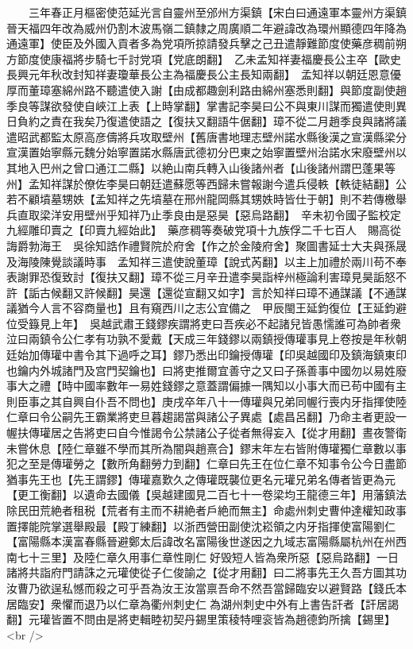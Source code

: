 　　三年春正月樞密使范延光言自靈州至邠州方渠鎮【宋白曰通遠軍本靈州方渠鎮晉天福四年改為威州仍割木波馬嶺二鎮隸之周廣順二年避諱改為環州顯德四年降為通遠軍】使臣及外國入貢者多為党項所掠請發兵擊之己丑遣靜難節度使藥彦稠前朔方節度使康福將步騎七千討党項【党底朗翻】　乙未孟知祥妻福慶長公主卒【歐史長興元年秋改封知祥妻瓊華長公主為福慶長公主長知兩翻】　孟知祥以朝廷恩意優厚而董璋塞綿州路不聽遣使入謝【由成都趣劍利路由綿州塞悉則翻】與節度副使趙季良等謀欲發使自峽江上表【上時掌翻】掌書記李昊曰公不與東川謀而獨遣使則異日負約之責在我矣乃復遣使語之【復扶又翻語牛倨翻】璋不從二月趙季良與諸將議遣昭武都監太原高彦儔將兵攻取壁州【舊唐書地理志壁州諾水縣後漢之宣漢縣梁分宣漢置始寧縣元魏分始寧置諾水縣唐武德初分巴東之始寧置壁州治諾水宋廢壁州以其地入巴州之曾口通江二縣】以絶山南兵轉入山後諸州者【山後諸州謂巴蓬果等州】孟知祥謀於僚佐李昊曰朝廷遣蘇愿等西歸未嘗報謝今遣兵侵軼【軼徒結翻】公若不顧墳墓甥妷【孟知祥之先墳墓在邢州龍岡縣其甥妷時皆仕于朝】則不若傳檄舉兵直取梁洋安用壁州乎知祥乃止季良由是惡昊【惡烏路翻】　辛未初令國子監校定九經雕印賣之【印賣九經始此】　藥彦稠等奏破党項十九族俘二千七百人　賜高從誨爵勃海王　吳徐知誥作禮賢院於府舍【作之於金陵府舍】聚圖書延士大夫與孫晟及海陵陳覺談議時事　孟知祥三遣使說董璋【說式芮翻】以主上加禮於兩川苟不奉表謝罪恐復致討【復扶又翻】璋不從三月辛丑遣李昊詣梓州極論利害璋見昊詬怒不許【詬古候翻又許候翻】昊還【還從宣翻又如字】言於知祥曰璋不通謀議【不通謀議猶今人言不容商量也】且有窺西川之志公宜備之　甲辰閩王延鈞復位【王延鈞避位受籙見上年】　吳越武肅王錢鏐疾謂將吏曰吾疾必不起諸兒皆愚懦誰可為帥者衆泣曰兩鎮令公仁孝有功孰不愛戴【天成三年錢鏐以兩鎮授傳瓘事見上卷按是年秋朝廷始加傳瓘中書令其下過呼之耳】鏐乃悉出印鑰授傳瓘【印吳越國印及鎮海鎮東印也鑰内外城諸門及宫門契鑰也】曰將吏推爾宜善守之又曰子孫善事中國勿以易姓廢事大之禮【時中國率數年一易姓錢鏐之意蓋謂偏據一隅知以小事大而已苟中國有主則臣事之其自興自仆吾不問也】庚戌卒年八十一傳瓘與兄弟同幄行喪内牙指揮使陸仁章曰令公嗣先王霸業將吏旦暮趨謁當與諸公子異處【處昌呂翻】乃命主者更設一幄扶傳瓘居之告將吏曰自今惟謁令公禁諸公子從者無得妄入【從才用翻】晝夜警衛未嘗休息【陸仁章雖不學而其所為闇與趙熹合】鏐末年左右皆附傳瓘獨仁章數以事犯之至是傳瓘勞之【數所角翻勞力到翻】仁章曰先王在位仁章不知事令公今日盡節猶事先王也【先王謂鏐】傳瓘嘉歎久之傳瓘既襲位更名元瓘兄弟名傳者皆更為元【更工衡翻】以遺命去國儀【吳越建國見二百七十一卷梁均王龍德三年】用藩鎮法除民田荒絶者租税【荒者有主而不耕絶者戶絶而無主】命處州刺史曹仲達權知政事置擇能院掌選舉殿最【殿丁練翻】以浙西營田副使沈崧領之内牙指揮使富陽劉仁【富陽縣本漢富春縣晉避鄭太后諱改名富陽後世遂因之九域志富陽縣屬杭州在州西南七十三里】及陸仁章久用事仁章性剛仁好毁短人皆為衆所惡【惡烏路翻】一日諸將共詣府門請誅之元瓘使從子仁俊諭之【從才用翻】曰二將事先王久吾方圖其功汝曹乃欲逞私憾而殺之可乎吾為汝王汝當禀吾命不然吾當歸臨安以避賢路【錢氏本居臨安】衆懼而退乃以仁章為衢州刺史仁為湖州刺史中外有上書告訐者【訐居謁翻】元瓘皆置不問由是將吏輯睦初契丹錫里策稜特哩衮皆為趙德鈞所擒【錫里】<br />
